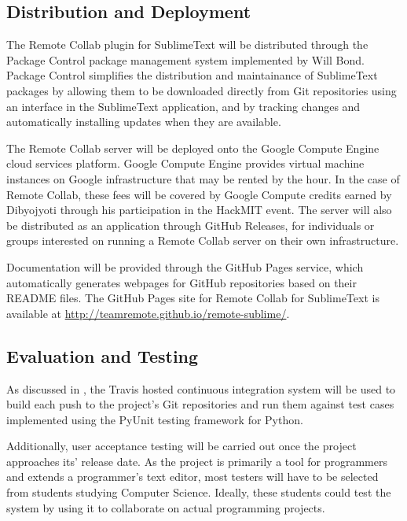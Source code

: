 \documentclass[11pt,english]{article}
\begin{document}
	\subsection{Distribution and Deployment}
	\label{sub:dist}
		The Remote Collab plugin for SublimeText will be distributed through the Package Control\cite{packagecontrol} package management system implemented by Will Bond. Package Control simplifies the distribution and maintainance of SublimeText packages by allowing them to be downloaded directly from Git repositories using an interface in the SublimeText application, and by tracking changes and automatically installing updates when they are available.

		The Remote Collab server will be deployed onto the Google Compute Engine\cite{googlecompute} cloud services platform. Google Compute Engine provides virtual machine instances on Google infrastructure that may be rented by the hour. In the case of Remote Collab, these fees will be covered by Google Compute credits earned by Dibyojyoti through his participation in the HackMIT event. The server will also be distributed as an application through GitHub Releases, for individuals or groups interested on running a Remote Collab server on their own infrastructure.

		Documentation will be provided through the GitHub Pages\cite{gh-pages} service, which automatically generates webpages for GitHub repositories based on their README files. The GitHub Pages site for Remote Collab for SublimeText is available at \url{http://teamremote.github.io/remote-sublime/}.

	\subsection{Evaluation and Testing}
		As discussed in , the Travis hosted continuous integration system will be used to build each push to the project's Git repositories and run them against test cases implemented using the PyUnit testing framework for Python.

		Additionally, user acceptance testing will be carried out once the project approaches its' release date. As the project is primarily a tool for programmers and extends a programmer's text editor, most testers will have to be selected from students studying Computer Science. Ideally, these students could test the system by using it to collaborate on actual programming projects.

	\pagebreak
	
	
\end{document}
